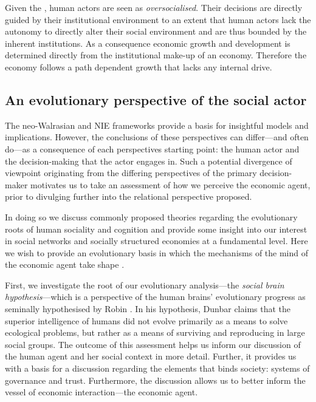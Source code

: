 Given the , human actors are seen as \emph{oversocialised}. Their decisions are directly guided by their institutional environment to an extent that human actors lack the autonomy to directly alter their social environment and are thus bounded by the inherent institutions. As a consequence economic growth and development is determined directly from the institutional make-up of an economy. Therefore the economy follows a path dependent growth that lacks any internal drive.

\subsection{An evolutionary perspective of the social actor}

The neo-Walrasian and NIE frameworks provide a basis for insightful models and implications. However, the conclusions of these perspectives can differ---and often do---as a consequence of each perspectives starting point: the human actor and the decision-making that the actor engages in. Such a potential divergence of viewpoint originating from the differing perspectives of the primary decision-maker motivates us to take an assessment of how we perceive the economic agent, prior to divulging further into the relational perspective proposed.

In doing so we discuss commonly proposed theories regarding the evolutionary roots of human sociality and cognition and provide some insight into our interest in social networks and socially structured economies at a fundamental level. Here we wish to provide an evolutionary basis in which the mechanisms of the mind of the economic agent take shape \citep{Pinker1997}. 

First, we investigate the root of our evolutionary analysis---the \emph{social brain hypothesis}---which is a perspective of the human brains' evolutionary progress as seminally hypothesised by Robin \citet{Dunbar1998}. In his hypothesis, Dunbar claims that the superior intelligence of humans did not evolve primarily as a means to solve ecological problems, but rather as a means of surviving and reproducing in large social groups. The outcome of this assessment helps us inform our discussion of the human agent and her social context in more detail. Further, it provides us with a basis for a discussion regarding the elements that binds society: systems of governance and trust. Furthermore, the discussion allows us to better inform the vessel of economic interaction---the economic agent.


